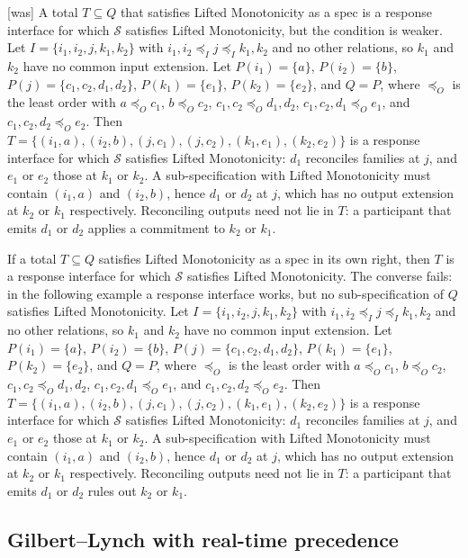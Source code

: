 \documentclass[sigconf]{cidr-2027}
\theoremstyle{remark}
\newcommand{\InputOrd}{\preceq_I}
\newcommand{\OutputOrd}{\preceq_O}
\newcommand{\commitment}{commitment\xspace}
\newcommand{\indesc}{input extension\xspace} %
\newcommand{\outnoun}{output extension\xspace}%
\newcommand{\Spec}{\mathcal{S}}
\newcommand{\fiber}[1]{P(#1)}
\begin{document}
{\footnotesize\color{black!50}\noindent\textsf{[was]} A total $T\subseteq Q$ that satisfies Lifted Monotonicity as a spec
is a response interface for which $\Spec$ satisfies Lifted Monotonicity, but the
condition is
weaker.  Let $I=\{i_1,i_2,j,k_1,k_2\}$ with $i_1,i_2\InputOrd j\InputOrd
k_1,k_2$ and no other relations, so $k_1$ and $k_2$ have no common \indesc.
Let $\fiber{i_1}=\{a\}$, $\fiber{i_2}=\{b\}$, $\fiber{j}=\{c_1,c_2,d_1,d_2\}$,
$\fiber{k_1}=\{e_1\}$, $\fiber{k_2}=\{e_2\}$, and $Q=P$, where $\OutputOrd$ is
the least order with $a\OutputOrd c_1$, $b\OutputOrd c_2$, $c_1,c_2\OutputOrd
d_1,d_2$, $c_1,c_2,d_1\OutputOrd e_1$, and $c_1,c_2,d_2\OutputOrd e_2$.  Then
$T=\{(i_1,a),(i_2,b),(j,c_1),(j,c_2),(k_1,e_1),(k_2,e_2)\}$ is a response
interface for which $\Spec$ satisfies Lifted Monotonicity: $d_1$ reconciles families at $j$, and
$e_1$ or $e_2$ those at $k_1$ or $k_2$.  A sub-specification with Lifted
Monotonicity must contain $(i_1,a)$ and $(i_2,b)$, hence $d_1$ or $d_2$ at $j$,
which has no \outnoun at $k_2$ or $k_1$ respectively.  Reconciling outputs
need not lie in $T$: a participant that emits $d_1$ or $d_2$ applies a \commitment to $k_2$ or
$k_1$.\par}

\color{blue!70!black}If a total $T\subseteq Q$ satisfies Lifted Monotonicity as a spec in its own
right, then $T$ is a response interface for which $\Spec$ satisfies Lifted
Monotonicity.  The converse fails: in the following example a response
interface works, but no sub-specification of $Q$ satisfies Lifted
Monotonicity.  Let $I=\{i_1,i_2,j,k_1,k_2\}$ with $i_1,i_2\InputOrd j\InputOrd
k_1,k_2$ and no other relations, so $k_1$ and $k_2$ have no common \indesc.
Let $\fiber{i_1}=\{a\}$, $\fiber{i_2}=\{b\}$, $\fiber{j}=\{c_1,c_2,d_1,d_2\}$,
$\fiber{k_1}=\{e_1\}$, $\fiber{k_2}=\{e_2\}$, and $Q=P$, where $\OutputOrd$ is
the least order with $a\OutputOrd c_1$, $b\OutputOrd c_2$, $c_1,c_2\OutputOrd
d_1,d_2$, $c_1,c_2,d_1\OutputOrd e_1$, and $c_1,c_2,d_2\OutputOrd e_2$.  Then
$T=\{(i_1,a),(i_2,b),(j,c_1),(j,c_2),(k_1,e_1),(k_2,e_2)\}$ is a response
interface for which $\Spec$ satisfies Lifted Monotonicity: $d_1$ reconciles families at $j$, and
$e_1$ or $e_2$ those at $k_1$ or $k_2$.  A sub-specification with Lifted
Monotonicity must contain $(i_1,a)$ and $(i_2,b)$, hence $d_1$ or $d_2$ at $j$,
which has no \outnoun at $k_2$ or $k_1$ respectively.  Reconciling outputs
need not lie in $T$: a participant that emits $d_1$ or $d_2$ rules out $k_2$ or $k_1$.\color{black}

\subsection{Gilbert--Lynch with real-time precedence}
\end{document}
